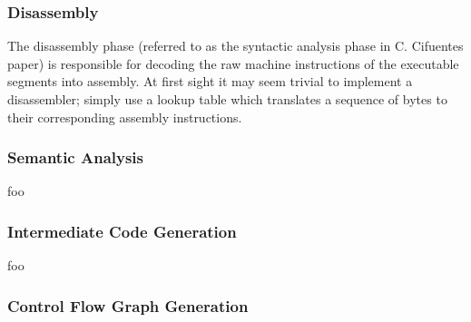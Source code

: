 \subsubsection{Disassembly}

The disassembly phase (referred to as the syntactic analysis phase in C. Cifuentes paper) is responsible for decoding the raw machine instructions of the executable segments into assembly. At first sight it may seem trivial to implement a disassembler; simply use a lookup table which translates a sequence of bytes to their corresponding assembly instructions.

%
%
%


\subsubsection{Semantic Analysis}

foo



\subsubsection{Intermediate Code Generation}

foo


\subsubsection{Control Flow Graph Generation}

